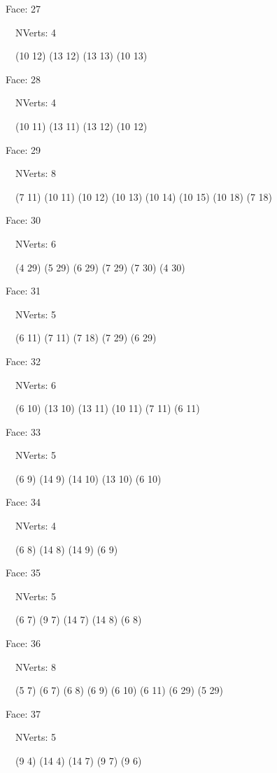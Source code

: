 \documentclass{article}
\begin{document}
{\footnotesize 

Face: 27

\   \    NVerts: 4

 \   \   (10 12) (13 12) (13 13) (10 13)}

{\footnotesize 

Face: 28

\   \    NVerts: 4

 \   \   (10 11) (13 11) (13 12) (10 12)}

{\footnotesize 

Face: 29

\   \    NVerts: 8

 \   \   (7 11) (10 11) (10 12) (10 13) (10 14) (10 15) (10 18) (7 18)}

{\footnotesize 

Face: 30

\   \    NVerts: 6

 \   \   (4 29) (5 29) (6 29) (7 29) (7 30) (4 30)}

{\footnotesize 

Face: 31

\   \    NVerts: 5

 \   \   (6 11) (7 11) (7 18) (7 29) (6 29)}

{\footnotesize 

Face: 32

\   \    NVerts: 6

 \   \   (6 10) (13 10) (13 11) (10 11) (7 11) (6 11)}

{\footnotesize 

Face: 33

\   \    NVerts: 5

 \   \   (6 9) (14 9) (14 10) (13 10) (6 10)}

{\footnotesize 

Face: 34

\   \    NVerts: 4

 \   \   (6 8) (14 8) (14 9) (6 9)}

{\footnotesize 

Face: 35

\   \    NVerts: 5

 \   \   (6 7) (9 7) (14 7) (14 8) (6 8)}

{\footnotesize 

Face: 36

\   \    NVerts: 8

 \   \   (5 7) (6 7) (6 8) (6 9) (6 10) (6 11) (6 29) (5 29)}

{\footnotesize 

Face: 37

\   \    NVerts: 5

 \   \   (9 4) (14 4) (14 7) (9 7) (9 6)}
\end{document}
